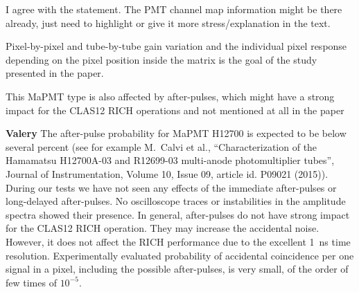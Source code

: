 \documentclass[11pt]{report}
\begin{document}
{\centering
\begin{tcolorbox}[enlarge top by=2em,colbacktitle=green!60!white,colframe=black!80!white,width=0.9\linewidth,left=30pt,right=30pt,top=10pt,bottom=10pt,boxrule=0.3pt,title=\bfseries our draft remarks]
I agree with the statement. The PMT channel map information might be there already, just need to highlight or give it more stress/explanation in the text.

Pixel-by-pixel and tube-by-tube gain variation and the individual pixel response 
depending on the pixel position inside the matrix is the goal of the study presented in the paper.

\end{tcolorbox}
}


\begin{tcolorbox}[enlarge top by=2em,colbacktitle=red!60!white,colframe=black!80!white,left=0pt,right=0pt,top=0pt,bottom=0pt,boxrule=0.3pt,title=\bfseries2.04]
This MaPMT type is also affected by after-pulses, which might have a strong impact for the CLAS12 RICH operations and not mentioned at all in the paper
\end{tcolorbox}

{\centering
\begin{tcolorbox}[enlarge top by=2em,colbacktitle=green!60!white,colframe=black!80!white,width=0.9\linewidth,left=30pt,right=30pt,top=10pt,bottom=10pt,boxrule=0.3pt,title=\bfseries our remarks]
{\bfseries Valery}
The after-pulse probability for MaPMT H12700 is expected to be below several percent (see for example M.~Calvi et al.,   ``Characterization of the Hamamatsu H12700A-03 and R12699-03 multi-anode photomultiplier tubes'', Journal of Instrumentation, Volume 10, Issue 09, article id. P09021 (2015)). 
During our tests we have not seen any effects of the immediate after-pulses or long-delayed after-pulses. 
No oscilloscope traces or  instabilities in the amplitude spectra showed their presence.
In general, after-pulses do not have strong impact for the CLAS12 RICH operation. They may increase the accidental noise. However, it does not affect the RICH performance due to the excellent 1~ns time resolution. Experimentally evaluated probability of accidental coincidence per one signal in a pixel, including the possible after-pulses, is very small, of the order of few times of $10^{-5}$.
\end{tcolorbox}
}
\end{document}
